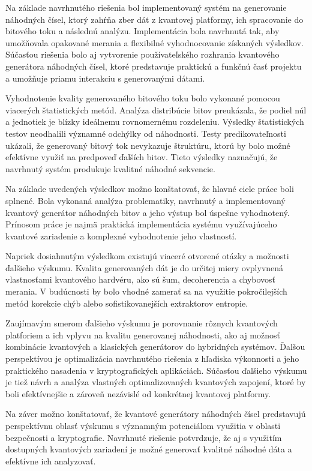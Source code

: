 Na základe navrhnutého riešenia bol implementovaný systém na generovanie náhodných čísel, ktorý zahŕňa zber dát z kvantovej platformy,
ich spracovanie do bitového toku a následnú analýzu. Implementácia bola navrhnutá tak, aby umožňovala opakované merania a flexibilné vyhodnocovanie získaných výsledkov.
Súčasťou riešenia bolo aj vytvorenie používateľského rozhrania kvantového generátora náhodných čísel,
ktoré predstavuje praktickú a funkčnú časť projektu a umožňuje priamu interakciu s generovanými dátami.

Vyhodnotenie kvality generovaného bitového toku bolo vykonané pomocou viacerých štatistických metód. Analýza distribúcie bitov preukázala, že podiel núl a jednotiek je blízky ideálnemu rovnomernému rozdeleniu. Výsledky štatistických testov neodhalili významné odchýlky od náhodnosti. Testy predikovateľnosti ukázali, že generovaný bitový tok nevykazuje štruktúru, ktorú by bolo možné efektívne využiť na predpoveď ďalších bitov. Tieto výsledky naznačujú, že navrhnutý systém produkuje kvalitné náhodné sekvencie.


Na základe uvedených výsledkov možno konštatovať, že hlavné ciele práce boli splnené. Bola vykonaná analýza problematiky, navrhnutý a implementovaný kvantový generátor náhodných bitov a jeho výstup bol úspešne vyhodnotený. Prínosom práce je najmä praktická implementácia systému využívajúceho kvantové zariadenie a komplexné vyhodnotenie jeho vlastností.


Napriek dosiahnutým výsledkom existujú viaceré otvorené otázky a možnosti ďalšieho výskumu. Kvalita generovaných dát je do určitej miery ovplyvnená vlastnosťami kvantového hardvéru, ako sú šum, decoherencia a chybovosť merania. V budúcnosti by bolo vhodné zamerať sa na využitie pokročilejších metód korekcie chýb alebo sofistikovanejších extraktorov entropie.

Zaujímavým smerom ďalšieho výskumu je porovnanie rôznych kvantových platforiem a ich vplyvu na kvalitu generovanej náhodnosti,
ako aj možnosť kombinácie kvantových a klasických generátorov do hybridných systémov.
Ďalšou perspektívou je optimalizácia navrhnutého riešenia z hľadiska výkonnosti a jeho praktického nasadenia v kryptografických aplikáciách.
Súčasťou ďalšieho výskumu je tiež návrh a analýza vlastných optimalizovaných kvantových zapojení, ktoré by boli efektívnejšie a zároveň nezávislé od
konkrétnej kvantovej platformy.

Na záver možno konštatovať, že kvantové generátory náhodných čísel predstavujú perspektívnu oblasť výskumu s významným potenciálom využitia v oblasti bezpečnosti a kryptografie. Navrhnuté riešenie potvrdzuje, že aj s využitím dostupných kvantových zariadení je možné generovať kvalitné náhodné dáta a efektívne ich analyzovať.

